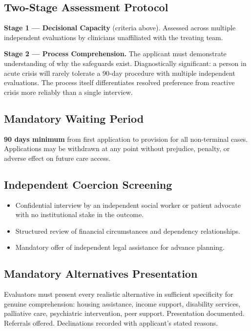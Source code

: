 \documentclass[11pt, letterpaper]{article}
\begin{document}
\subsection{Two-Stage Assessment Protocol}

\textbf{Stage 1 --- Decisional Capacity} (criteria above). Assessed across multiple
independent evaluations by clinicians unaffiliated with the treating team.

\textbf{Stage 2 --- Process Comprehension.} The applicant must demonstrate understanding of
why the safeguards exist. Diagnostically significant: a person in acute crisis will rarely
tolerate a 90-day procedure with multiple independent evaluations. The process itself
differentiates resolved preference from reactive crisis more reliably than a single interview.

\subsection{Mandatory Waiting Period}

\textbf{90 days minimum} from first application to provision for all non-terminal cases.
Applications may be withdrawn at any point without prejudice, penalty, or adverse effect
on future care access.

\subsection{Independent Coercion Screening}

\begin{itemize}
  \item Confidential interview by an independent social worker or patient advocate
    with no institutional stake in the outcome.
  \item Structured review of financial circumstances and dependency relationships.
  \item Mandatory offer of independent legal assistance for advance planning.
\end{itemize}

\subsection{Mandatory Alternatives Presentation}

Evaluators must present every realistic alternative in sufficient specificity for genuine
comprehension: housing assistance, income support, disability services, palliative care,
psychiatric intervention, peer support. Presentation documented. Referrals offered.
Declinations recorded with applicant's stated reasons.
\end{document}
